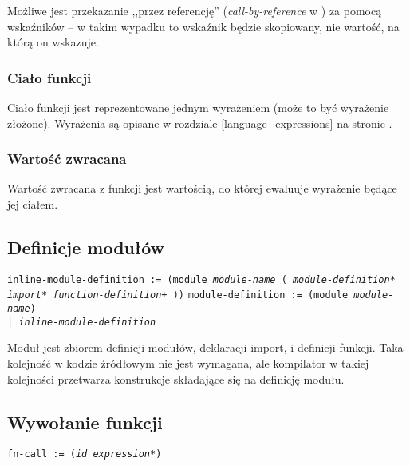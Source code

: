 Możliwe jest przekazanie ,,przez referencję'' (\emph{call-by-reference} w
\cite{ProgrammingLanguagePragmatics}) za pomocą wskaźników -- w takim wypadku to
wskaźnik będzie skopiowany, nie wartość, na którą on wskazuje.

\subsubsection{Ciało funkcji}

Ciało funkcji jest reprezentowane jednym wyrażeniem (może to być wyrażenie złożone).
Wyrażenia są opisane w rozdziale
\ref{language_expressions} na stronie \pageref{language_expressions}.

\subsubsection{Wartość zwracana}

Wartość zwracana z funkcji jest wartością, do której ewaluuje wyrażenie będące jej ciałem.

\subsection{Definicje modułów}
\label{viuact_spec_module_definition}

\texttt{inline-module-definition := (module \emph{module-name} (
\newline
\phantom{inline-module-definition := ~ }\emph{module-definition}*
\newline
\phantom{inline-module-definition := ~ }\emph{import}*
\newline
\phantom{inline-module-definition := ~ }\emph{function-definition}+
))}
\newline
\texttt{module-definition := (module \emph{module-name}) \\
\phantom{module-definition :}| \emph{inline-module-definition}}
\newline

Moduł jest zbiorem definicji modułów, deklaracji import, i definicji funkcji.
Taka kolejność w kodzie źródłowym nie jest wymagana, ale kompilator w takiej kolejności przetwarza konstrukcje
składające się na definicję modułu.

\subsection{Wywołanie funkcji}
\label{viuact_spec_fn_call}

\texttt{fn-call := (\emph{id} \emph{expression}*)}
\newline

